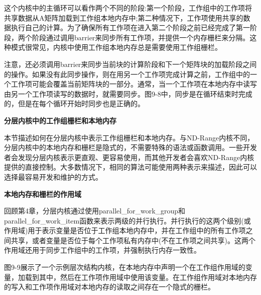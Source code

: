 这个内核中的主循环可以看作两个不同的阶段:第一个阶段，工作组中的工作项将共享数据从A矩阵加载到工作组本地内存中;第二种情况下，工作项使用共享的数据执行自己的计算。为了确保所有工作项在进入第二个阶段之前已经完成了第一阶段，两个阶段通过调用barrier来同步所有工作项，并提供一个内存栅栏来分隔。这种模式很常见，内核中使用工作组本地内存总是需要使用工作组栅栏。\par

注意，还必须调用barrier来同步当前块的计算阶段和下一个矩阵块的加载阶段之间的操作。如果没有此同步操作，则在用另一个工作项完成计算之前，工作组中的一个工作项可能会覆盖当前矩阵块的一部分。通常，当一个工作项在本地内存中读写由另一个工作项读写的数据时，就需要同步。图9-8中，同步是在循环结束时完成的，但是在每个循环开始时同步也是正确的。\par

\hspace*{\fill} \par %
\textbf{分层内核中的工作组栅栏和本地内存}

本节描述如何在分层内核中表示工作组栅栏和本地内存。与ND-Range内核不同，分层内核中的本地内存和栅栏是隐式的，不需要特殊的语法或函数调用。一些开发者会发现分层内核表示更直观、更容易使用，而其他开发者会喜欢ND-Range内核提供的直接控制。大多数情况下，相同的算法可能使用两种表示来描述，因此可以选择最容易开发和维护的方式。\par

\hspace*{\fill} \par %
\textbf{本地内存和栅栏的作用域}

回顾第4章，分层内核通过使用parallel\_for\_work\_group和parallel\_for\_work\_item函数来表示两级的并行执行。并行执行的这两个级别(或作用域)用于表示变量是否位于工作组本地内存中，并在工作组中的所有工作项之间共享，或者变量是否位于每个工作项私有内存中(不在工作项之间共享)。这两个作用域还用于同步工作组中的工作项，并强制执行内存一致性。\par

图9-9展示了一个示例层次结构内核，在本地内存中声明一个在工作组作用域的变量，加载到其中，然后在工作项作用域中使用该变量。在工作组作用域对本地内存的写入和工作项作用域对本地内存的读取之间存在一个隐式的栅栏。\par

